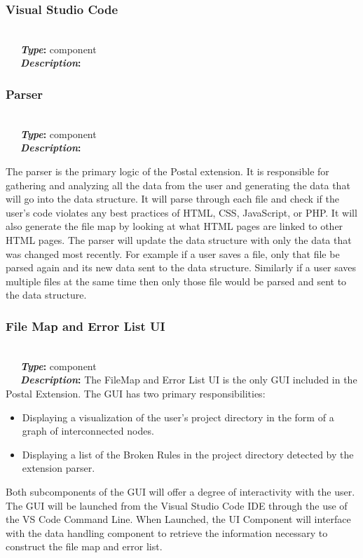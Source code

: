 \documentclass[letterpaper,10pt,titlepage,draftclsnofoot,onecolumn,onesided] {IEEEtran}
\newcommand{\bolditin}[2]{
	\-\ \-\ \-\ \textbf{\textit{#1}#2}
}
\begin{document}
\subsubsection{Visual Studio Code}
\hfill \\
\bolditin{Type}{:} component \\
\bolditin{Description}{:} 

\subsubsection{Parser}
\hfill \\
\bolditin{Type}{:} component \\
\bolditin{Description}{:} 
The parser is the primary logic of the Postal extension. 
It is responsible for gathering and analyzing all the data from the user and generating the data that will go into the data structure.
It will parse through each file and check if the user's code violates any best practices of HTML, CSS, JavaScript, or PHP. 
It will also generate the file map by looking at what HTML pages are linked to other HTML pages.
The parser will update the data structure with only the data that was changed most recently.
For example if a user saves a file, only that file be parsed again and its new data sent to the data structure.
Similarly if a user saves multiple files at the same time then only those file would be parsed and sent to the data structure.
	
\subsubsection{File Map and Error List UI}
\hfill \\
\bolditin{Type}{:} component \\
\bolditin{Description}{:} The FileMap and Error List UI is the only GUI included in the Postal Extension. 
The GUI has two primary responsibilities: 
\begin{itemize}
	\item Displaying a visualization of the user's project directory in the form of a graph of interconnected nodes.
	\item Displaying a list of the Broken Rules in the project directory detected by the extension parser.
\end{itemize}
Both subcomponents of the GUI will offer a degree of interactivity with the user. 
The GUI will be launched from the Visual Studio Code IDE through the use of the VS Code Command Line.
When Launched, the UI Component will interface with the data handling component to retrieve the information necessary to construct the file map and error list.
\end{document}
